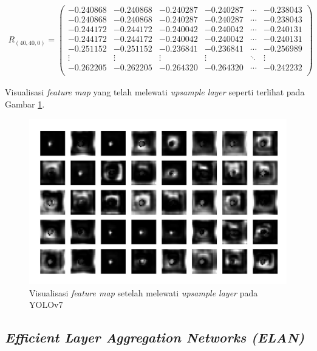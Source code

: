     \begin{align*}
        R_{(40, 40, 0)} = 
        \begin{pmatrix}
            -0.240868 & -0.240868 & -0.240287 & -0.240287 & \cdots & -0.238043 \\
            -0.240868 & -0.240868 & -0.240287 & -0.240287 & \cdots & -0.238043 \\
            -0.244172 & -0.244172 & -0.240042 & -0.240042 & \cdots & -0.240131 \\
            -0.244172 & -0.244172 & -0.240042 & -0.240042 & \cdots & -0.240131 \\
            -0.251152 & -0.251152 & -0.236841 & -0.236841 & \cdots & -0.256989 \\
            \vdots    & \vdots    & \vdots    & \vdots    & \ddots & \vdots \\
            -0.262205 & -0.262205 & -0.264320 & -0.264320 & \cdots & -0.242232 \\
        \end{pmatrix}
    \end{align*}

    Visualisasi \textit{feature map} yang telah melewati \textit{upsample layer} seperti terlihat pada Gambar \ref{fig:d-uplayer}.

    \begin{figure}[H]
        \begin{center}
            \includegraphics[width=12cm]{img/bab4/up-layer.png}
            \caption{Visualisasi \textit{feature map} setelah melewati \textit{upsample layer} pada YOLOv7}
            \label{fig:d-uplayer}
        \end{center}
    \end{figure}

    \subsection{\textit{Efficient Layer Aggregation Networks (ELAN)}}

